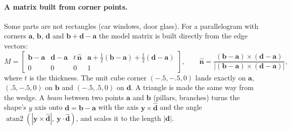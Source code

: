 \paragraph{A matrix built from corner points.} Some parts are not rectangles (car windows, door glass).
For a parallelogram with corners $\mathbf{a}$, $\mathbf{b}$, $\mathbf{d}$ and $\mathbf{b}+\mathbf{d}-\mathbf{a}$
the model matrix is built directly from the edge vectors:
\[
M = \begin{bmatrix} \mathbf{b}-\mathbf{a} & \mathbf{d}-\mathbf{a} & t\,\hat{\mathbf{n}} & \mathbf{a}+\tfrac12(\mathbf{b}-\mathbf{a})+\tfrac12(\mathbf{d}-\mathbf{a}) \\ 0&0&0&1\end{bmatrix},
\qquad \hat{\mathbf{n}}=\frac{(\mathbf{b}-\mathbf{a})\times(\mathbf{d}-\mathbf{a})}{|(\mathbf{b}-\mathbf{a})\times(\mathbf{d}-\mathbf{a})|},
\]
where $t$ is the thickness. The unit cube corner $(-.5,-.5,0)$ lands exactly on $\mathbf{a}$, $(.5,-.5,0)$
on $\mathbf{b}$ and $(-.5,.5,0)$ on $\mathbf{d}$. A triangle is made the same way from the wedge.
A \emph{beam} between two points $\mathbf{a}$ and $\mathbf{b}$ (pillars, branches) turns the shape's $y$ axis
onto $\mathbf{d}=\mathbf{b}-\mathbf{a}$ with the axis $\mathbf{y}\times\hat{\mathbf{d}}$ and the angle
$\operatorname{atan2}(|\mathbf{y}\times\hat{\mathbf{d}}|,\ \mathbf{y}\cdot\hat{\mathbf{d}})$, and scales it to
the length $|\mathbf{d}|$.


